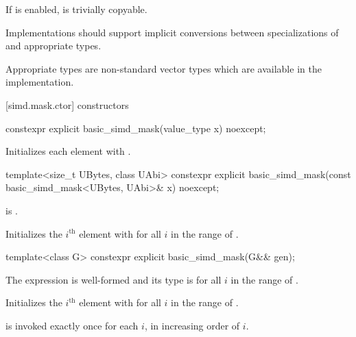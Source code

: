 If  is enabled,
 is trivially copyable.

\pnum
\recommended Implementations should support implicit conversions between
specializations of  and appropriate  types.
\begin{note}
Appropriate types are non-standard vector types which are available in the
implementation.
\end{note}

[simd.mask.ctor]{ constructors}

\begin{itemdecl}
constexpr explicit basic_simd_mask(value_type x) noexcept;
\end{itemdecl}

\begin{itemdescr}
\pnum
\effects
Initializes each element with .
\end{itemdescr}

\begin{itemdecl}
template<size_t UBytes, class UAbi>
  constexpr explicit basic_simd_mask(const basic_simd_mask<UBytes, UAbi>& x) noexcept;
\end{itemdecl}

\begin{itemdescr}
\pnum
\constraints
{} is
.

\pnum
\effects
Initializes the $i^\text{th}$ element with  for all $i$ in the
range of .
\end{itemdescr}

\begin{itemdecl}
template<class G> constexpr explicit basic_simd_mask(G&& gen);
\end{itemdecl}

\begin{itemdescr}
\pnum
\constraints
The expression  is
well-formed and its type is  for all $i$ in the range of
.

\pnum
\effects
Initializes the $i^\text{th}$ element with
 for all $i$ in
the range of .

\pnum
\remarks
{} is invoked exactly once for each $i$, in increasing order of $i$.
\end{itemdescr}


